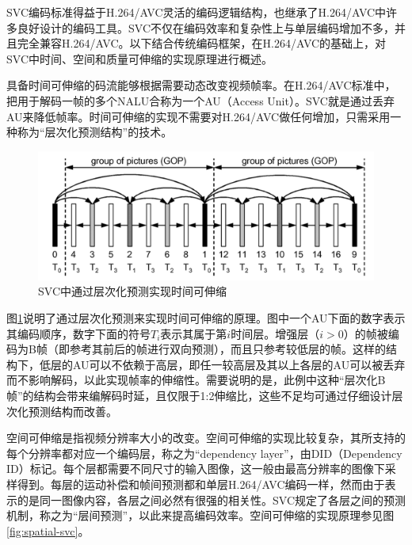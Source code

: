 SVC编码标准得益于H.264/AVC灵活的编码逻辑结构，也继承了H.264/AVC中许多良好设计的编码工具。SVC不仅在编码效率和复杂性上与单层编码增加不多\supercite{SVC-Performance}，并且完全兼容H.264/AVC。以下结合传统编码框架，在H.264/AVC的基础上，对SVC中时间、空间和质量可伸缩的实现原理进行概述。

具备时间可伸缩的码流能够根据需要动态改变视频帧率。在H.264/AVC标准中，把用于解码一帧的多个NALU合称为一个AU（Access Unit）。SVC就是通过丢弃AU来降低帧率。时间可伸缩的实现不需要对H.264/AVC做任何增加，只需采用一种称为“层次化预测结构”的技术。

\begin{figure}[h]
	\centering
	\includegraphics[width = 1.0\linewidth]{figures/temporal-svc.png}
	\caption{SVC中通过层次化预测实现时间可伸缩\label{fig:temporal-svc}}
\end{figure}

图\ref{fig:temporal-svc}\supercite{SVC-Overview}说明了通过层次化预测来实现时间可伸缩的原理。图中一个AU下面的数字表示其编码顺序，数字下面的符号$T_i$表示其属于第$i$时间层。增强层（$i>0$）的帧被编码为B帧（即参考其前后的帧进行双向预测），而且只参考较低层的帧。这样的结构下，低层的AU可以不依赖于高层，即任一较高层及其以上各层的AU可以被丢弃而不影响解码，以此实现帧率的伸缩性。需要说明的是，此例中这种“层次化B帧”的结构会带来编解码时延，且仅限于1:2伸缩比，这些不足均可通过仔细设计层次化预测结构而改善。

空间可伸缩是指视频分辨率大小的改变。空间可伸缩的实现比较复杂，其所支持的每个分辨率都对应一个编码层，称之为“dependency layer”，由DID（Dependency ID）标记。每个层都需要不同尺寸的输入图像，这一般由最高分辨率的图像下采样得到。每层的运动补偿和帧间预测都和单层H.264/AVC编码一样，然而由于表示的是同一图像内容，各层之间必然有很强的相关性。SVC规定了各层之间的预测机制，称之为“层间预测”，以此来提高编码效率。空间可伸缩的实现原理参见图\ref{fig:spatial-svc}\supercite{SVC-Spatial}。


